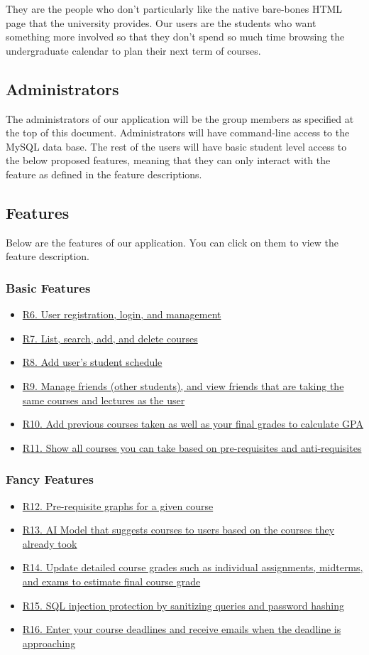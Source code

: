 \documentclass[12pt, a4paper]{article}
\begin{document}
They are the people who don't particularly like the native bare-bones HTML page that the university provides. Our users are the students who want something more involved so that they don't spend so much time browsing the undergraduate calendar to plan their next term of courses.

\subsection*{Administrators}
The administrators of our application will be the group members as specified at the top of this document. Administrators will have command-line access to the MySQL data base. The rest of the users will have basic student level access to the below proposed features, meaning that they can only interact with the feature as defined in the feature descriptions.

\subsection*{Features}
Below are the features of our application. You can click on them to view the feature description.
\subsubsection*{Basic Features}
\begin{itemize}
    \item \hyperref[sec:R6]{R6. User registration, login, and management}
    \item \hyperref[sec:R7]{R7. List, search, add, and delete courses}
    \item \hyperref[sec:R8]{R8. Add user's student schedule}
    \item \hyperref[sec:R9]{R9. Manage friends (other students), and view friends that are taking the same courses and lectures as the user}
    \item \hyperref[sec:R10]{R10. Add previous courses taken as well as your final grades to calculate GPA}
    \item \hyperref[sec:R11]{R11. Show all courses you can take based on pre-requisites and anti-requisites}
\end{itemize}

\subsubsection*{Fancy Features}
\begin{itemize}
    \item \hyperref[sec:R12]{R12. Pre-requisite graphs for a given course}
    \item \hyperref[sec:R13]{R13. AI Model that suggests courses to users based on the courses they already took}
    \item \hyperref[sec:R14]{R14. Update detailed course grades such as individual assignments, midterms, and exams to estimate final course grade}
    \item \hyperref[sec:R15]{R15. SQL injection protection by sanitizing queries and password hashing}
    \item \hyperref[sec:R16]{R16. Enter your course deadlines and receive emails when the deadline is approaching}
\end{itemize}
\end{document}
